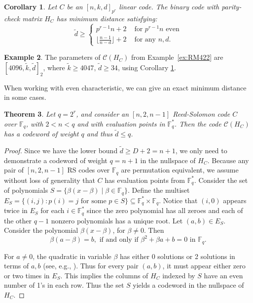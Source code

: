 \documentclass[11pt]{amsart}
\newtheorem{theorem}{Theorem}[section]
\newtheorem{corollary}[theorem]{Corollary}
\theoremstyle{definition}
\newtheorem{example}[theorem]{Example}
\newcommand{\0}{\mathbf{0}}
\newcommand{\C}{\mathcal{C}}
\newcommand{\F}{\mathbb{F}}
\begin{document}
\begin{corollary} \label{cor:min-dist}
    Let $C$ be an $[n, k, d]_{p^r}$ linear code. The binary code with parity-check matrix $H_C$ has minimum distance satisfying: 
    \[ \tilde{d}\geq \begin{cases} p^{r-1}n+2 &\text{ for } p^{r-1}n  \text{ even} \\ 
    \lfloor\frac{n-1}{n-d}\rfloor+2 & \text{ for any } n, d.
    \end{cases} \]
\end{corollary}

\begin{example}
    The parameters of $\mathcal{C}(H_C)$ from  Example~\ref{ex:RM422} are $[4096, \tilde{k}, \tilde{d}]_2$, where $\tilde{k}\geq 4047$, $\tilde{d}\geq 34$, using Corollary \ref{cor:min-dist}.
\end{example}

When working with even characteristic, we can give an exact minimum distance in some cases. 


\begin{theorem} \label{thm:even} Let $q=2^r$,  and consider an $[n, 2, n-1]$ Reed-Solomon code $C$ over $\mathbb{F}_q$, with $2< n<q$ and with evaluation points in $\F_q^*$. Then the code $\C(H_C)$ has a codeword of weight $q$ and thus $\tilde{d}\leq q$. 
\end{theorem}

\begin{proof} Since we have the lower bound $\tilde{d}\geq D+2=n+1$, we only need to demonstrate a codeword of weight $q=n+1$ in the nullspace of $H_C$. 
Because any pair of  $[n, 2, n-1]$ RS codes  over $\mathbb{F}_q$ are permutation equivalent,  we assume without loss of generality that $C$ has  evaluation points from  $\F_q^*$. 
Consider the set of polynomials   
$S= \{\beta(x-\beta)\mid \beta\in \F_q \}$.
Define the multiset $E_S=\{(i,j): p(i)=j \text{ for some } p\in S\}\subseteq \F_q^*\times \F_q$.  
    Notice that $(i,0)$ appears twice in $E_S$ for each $i\in \F_q^*$ since the zero polynomial has all zeroes and each of the other $q-1$ nonzero polynomials has a unique root. 
Let $(a, b)\in E_S$.
Consider the polynomial $\beta(x-\beta)$, for $\beta\neq 0$. Then 
\[ \beta(a-\beta)=b, \text{ if and only if } \beta^2+\beta a+b=0 \text{ in } \F_q.\]

For $a\neq 0$, the quadratic in variable $\beta$ has either 0 solutions or 2 solutions in terms of $a, b$ (see, e.g., \cite{cox2012galois}). Thus for every pair $(a,b)$, it must appear either zero or two times in $E_S$. This implies the columns of $H_C$ indexed by $S$ have an even number of 1's in each row. 
Thus the set $S$ yields a codeword in the nullspace of $H_{C}$. 
\end{proof}
\end{document}
